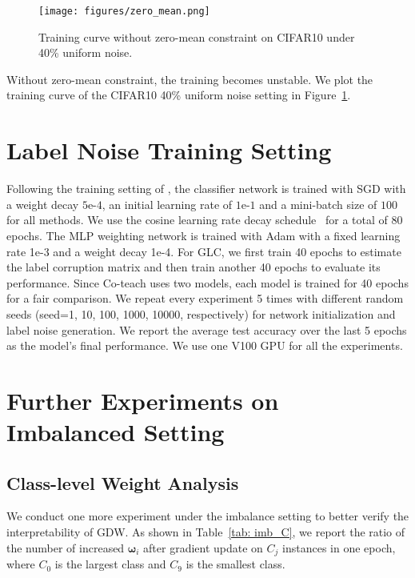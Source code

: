 \begin{figure}[htbp]
    \centering
    \texttt{[image: figures/zero\_mean.png]}
    \caption{Training curve without zero-mean constraint on CIFAR10 under 40\% uniform noise.}
    \label{fig:zero_mean}
\end{figure}
  
Without zero-mean constraint, the training becomes unstable.
%
We plot the training curve of the CIFAR10 40\% uniform noise setting in Figure~\ref{fig:zero_mean}.

\section{Label Noise Training Setting}
\label{section: Appendix_C}
Following the training setting of \cite{shuMetaWeightNetLearningExplicit2019a}, the classifier network is trained with SGD with a weight decay $5$e-$4$, an initial learning rate of $1$e-$1$ and a mini-batch size of $100$ for all methods. 
%
We use the cosine learning rate decay schedule~\cite{loshchilovSGDRStochasticGradient2016} for a total of 80 epochs.
%
The MLP weighting network is trained with Adam \cite{kingmaAdamMethodStochastic2015} with a fixed learning rate 1e-3 and a weight decay 1e-4.
%
For GLC, we first train 40 epochs to estimate the label corruption matrix and then train another 40 epochs to evaluate its performance.
%
Since Co-teach uses two models, each model is trained for 40 epochs for a fair comparison.
%
We repeat every experiment 5 times with different random seeds (seed=1, 10, 100, 1000, 10000, respectively) for network initialization and label noise generation.
%
We report the average test accuracy over the last 5 epochs as the model's final performance.
%
We use one V100 GPU for all the experiments.

\section{Further Experiments on Imbalanced Setting}
\label{section: Appendix_D}
\subsection{Class-level Weight Analysis}
We conduct one more experiment under the imbalance setting to better verify the interpretability of GDW.
%
As shown in Table~\ref{tab: imb_C}, we report the ratio of the number of increased $\boldsymbol\omega_i$ after gradient update on $C_j$ instances in one epoch, where $C_0$ is the largest class and $C_9$ is the smallest class.

